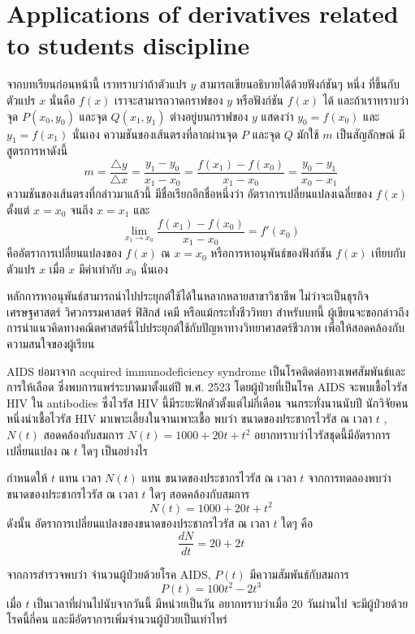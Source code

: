 \documentclass[
]{book}
\begin{document}
\section{Applications of derivatives related to students
discipline}\label{applications-of-derivatives-related-to-students-discipline}

จากบทเรียนก่อนหน้านี้ เราทราบว่าถ้าตัวแปร \(y\) สามารถเขียนอธิบายได้ด้วยฟังก์ชันๆ หนึ่ง
ที่ขึ้นกับตัวแปร \(x\) นั่นคือ \(f(x)\) เราจะสามารถวาดกราฟของ \(y\) หรือฟังก์ชัน
\(f(x)\) ได้ และถ้าเราทราบว่า จุด \(P(x_0,y_0)\) และจุด \(Q(x_1,y_1)\)
ต่างอยู่บนกราฟของ \(y\) แสดงว่า \(y_0=f(x_0)\) และ \(y_1=f(x_1)\) นั่นเอง
ความชันของเส้นตรงที่ลากผ่านจุด \(P\) และจุด \(Q\) มักใช้ \(m\) เป็นสัญลักษณ์
มีสูตรการหาดังนี้
\[m=\frac{\triangle y}{\triangle x}=\frac{y_1-y_0}{ x_1-x_0}=\frac{f(x_1)-f(x_0)}{ x_1-x_0}=\frac{y_0-y_1}{ x_0-x_1}\]
ความชันของเส้นตรงที่กล่าวมาแล้วนี้ มีชื่อเรียกอีกชื่อหนึ่งว่า อัตราการเปลี่ยนแปลงเฉลี่ยของ
\(f(x)\) ตั้งแต่ \(x=x_0\) จนถึง \(x=x_1\) และ
\[\lim_{x_1 \rightarrow x_0} \frac{f(x_1)-f(x_0)}{ x_1-x_0} =f'(x_0)\]
คืออัตราการเปลี่ยนแปลงของ \(f(x)\) ณ \(x=x_0\) หรือการหาอนุพันธ์ของฟังก์ชัน
\(f(x)\) เทียบกับตัวแปร \(x\) เมื่อ \(x\) มีค่าเท่ากับ \(x_0\) นั่นเอง

หลักการหาอนุพันธ์สามารถนำไปประยุกต์ใช้ได้ในหลากหลายสาขาวิชาชีพ ไม่ว่าจะเป็นธุรกิจ
เศรษฐศาสตร์ วิศวกรรมศาสตร์ ฟิสิกส์ เคมี หรือแม้กระทั่งชีววิทยา สำหรับบทนี้
ผู้เขียนจะขอกล่าวถึง การนำแนวคิดทางคณิตศาสตร์นี้ไปประยุกต์ใช้กับปัญหาทางวิทยาศาสตร์ชีวภาพ
เพื่อให้สอดคล้องกับความสนใจของผู้เรียน

AIDS ย่อมาจาก acquired immunodeficiency syndrome
เป็นโรคติดต่อทางเพศสัมพันธ์และการให้เลือด ซึ่งพบการแพร่ระบาดมาตั้งแต่ปี พ.ศ. 2523
โดยผู้ป่วยที่เป็นโรค AIDS จะพบเชื้อไวรัส HIV ใน antibodies ซึ่งไวรัส HIV
นี้มีระยะฟักตัวตั้งแต่ไม่กี่เดือน จนกระทั่งนานนับปี นักวิจัยคนหนึ่งนำเชื้อไวรัส HIV
มาเพาะเลี้ยงในจานเพาะเชื้อ พบว่า ขนาดของประชากรไวรัส ณ เวลา \(t\) , \(N(t)\)
สอดคล้องกับสมการ \(N(t)=1000+20t+t^2\) อยากทราบว่าไวรัสชุดนี้มีอัตราการเปลี่ยนแปลง
ณ \(t\) ใดๆ เป็นอย่างไร

กำหนดให้ \(t\) แทน เวลา \(N(t)\) แทน ขนาดของประชากรไวรัส ณ เวลา \(t\)
จากการทดลองพบว่า ขนาดของประชากรไวรัส ณ เวลา \(t\) ใดๆ สอดคล้องกับสมการ
\[N(t)=1000+20t+t^2\] ดังนั้น อัตราการเปลี่ยนแปลงของขนาดของประชากรไวรัส ณ เวลา
\(t\) ใดๆ คือ \[\frac{dN}{dt}=20+2t\]

จากการสำรวจพบว่า จำนวนผู้ป่วยด้วยโรค AIDS, \(P(t)\) มีความสัมพันธ์กับสมการ
\[P(t)=100t^2-2t^3\] เมื่อ \(t\) เป็นเวลาที่ผ่านไปนับจากวันนี้ มีหน่วยเป็นวัน
อยากทราบว่าเมื่อ 20 วันผ่านไป จะมีผู้ป่วยด้วยโรคนี้กี่คน
และมีอัตราการเพิ่มจำนวนผู้ป่วยเป็นเท่าไหร่
\end{document}
